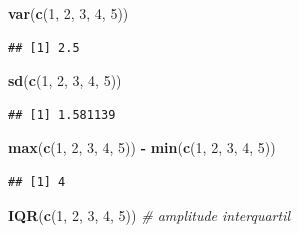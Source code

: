 \documentclass[
]{book}
\newenvironment{Shaded}{\begin{snugshade}}{\end{snugshade}}
\newcommand{\CommentTok}[1]{\textcolor[rgb]{0.56,0.35,0.01}{\textit{#1}}}
\newcommand{\DecValTok}[1]{\textcolor[rgb]{0.00,0.00,0.81}{#1}}
\newcommand{\FunctionTok}[1]{\textcolor[rgb]{0.13,0.29,0.53}{\textbf{#1}}}
\newcommand{\NormalTok}[1]{#1}
\newcommand{\SpecialCharTok}[1]{\textcolor[rgb]{0.81,0.36,0.00}{\textbf{#1}}}
\begin{document}
\begin{Shaded}
\begin{Highlighting}[]
\FunctionTok{var}\NormalTok{(}\FunctionTok{c}\NormalTok{(}\DecValTok{1}\NormalTok{, }\DecValTok{2}\NormalTok{, }\DecValTok{3}\NormalTok{, }\DecValTok{4}\NormalTok{, }\DecValTok{5}\NormalTok{))}
\end{Highlighting}
\end{Shaded}

\begin{verbatim}
## [1] 2.5
\end{verbatim}

\begin{Shaded}
\begin{Highlighting}[]
\FunctionTok{sd}\NormalTok{(}\FunctionTok{c}\NormalTok{(}\DecValTok{1}\NormalTok{, }\DecValTok{2}\NormalTok{, }\DecValTok{3}\NormalTok{, }\DecValTok{4}\NormalTok{, }\DecValTok{5}\NormalTok{))}
\end{Highlighting}
\end{Shaded}

\begin{verbatim}
## [1] 1.581139
\end{verbatim}

\begin{Shaded}
\begin{Highlighting}[]
\FunctionTok{max}\NormalTok{(}\FunctionTok{c}\NormalTok{(}\DecValTok{1}\NormalTok{, }\DecValTok{2}\NormalTok{, }\DecValTok{3}\NormalTok{, }\DecValTok{4}\NormalTok{, }\DecValTok{5}\NormalTok{)) }\SpecialCharTok{{-}} \FunctionTok{min}\NormalTok{(}\FunctionTok{c}\NormalTok{(}\DecValTok{1}\NormalTok{, }\DecValTok{2}\NormalTok{, }\DecValTok{3}\NormalTok{, }\DecValTok{4}\NormalTok{, }\DecValTok{5}\NormalTok{))}
\end{Highlighting}
\end{Shaded}

\begin{verbatim}
## [1] 4
\end{verbatim}

\begin{Shaded}
\begin{Highlighting}[]
\FunctionTok{IQR}\NormalTok{(}\FunctionTok{c}\NormalTok{(}\DecValTok{1}\NormalTok{, }\DecValTok{2}\NormalTok{, }\DecValTok{3}\NormalTok{, }\DecValTok{4}\NormalTok{, }\DecValTok{5}\NormalTok{))   }\CommentTok{\# amplitude interquartil}
\end{Highlighting}
\end{Shaded}
\end{document}

